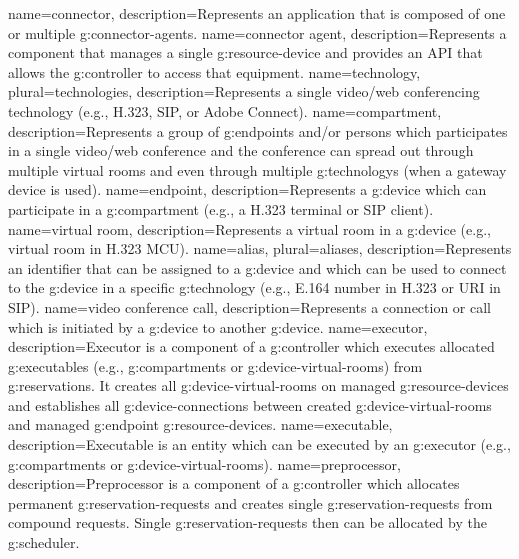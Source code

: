 {
  name=connector,
  description={Represents an application that is composed of one or multiple \glspl{g:connector-agent}.}
}
{
  name=connector agent,
  description={Represents a component that manages a single \gls{g:resource-device} 
    and provides an API that allows the \gls{g:controller} to access that equipment.}
}
{
  name=technology,
  plural=technologies,
  description={Represents a single video/web conferencing technology (e.g., 
    H.323, SIP, or Adobe Connect).}
}
{
  name=compartment,
  description={Represents a group of \glspl{g:endpoint} and/or persons which participates 
    in a single video/web conference and the conference can spread out through multiple 
    virtual rooms and even through multiple \glspl{g:technology} (when a gateway device is used).}
}
{
  name=endpoint,
  description={Represents a \gls{g:device} which can participate in a \gls{g:compartment} (e.g., a H.323 terminal or SIP client).}
}
{
  name=virtual room,
  description={Represents a virtual room in a \gls{g:device} (e.g., virtual room in H.323 MCU).}
}
{
  name=alias,
  plural=aliases,
  description={Represents an identifier that can be assigned to a \gls{g:device} and
    which can be used to connect to the \gls{g:device} in a specific \gls{g:technology} 
    (e.g., E.164 number in H.323 or URI in SIP).}
}
{
  name=video conference call,
  description={Represents a connection or call which is initiated by a 
    \gls{g:device} to another \gls{g:device}.}
}
{
  name=executor,
  description={Executor is a component of a \gls{g:controller} which executes
    allocated \glspl{g:executable} (e.g., \glspl{g:compartment} or \glspl{g:device-virtual-room})
    from \glspl{g:reservation}. It creates all \glspl{g:device-virtual-room} on managed 
    \glspl{g:resource-device} and establishes all \glspl{g:device-connection} between created 
    \glspl{g:device-virtual-room} and managed \gls{g:endpoint} 
    \glspl{g:resource-device}.}
}
{
  name=executable,
  description={Executable is an entity which can be executed by an \gls{g:executor} (e.g., \glspl{g:compartment} or \glspl{g:device-virtual-room}).}
}
{
  name=preprocessor,
  description={Preprocessor is a component of a \gls{g:controller} which allocates
    permanent \glspl{g:reservation-request} and creates single \glspl{g:reservation-request} 
    from compound requests. Single \glspl{g:reservation-request} then can be allocated 
    by the \gls{g:scheduler}.}
}


